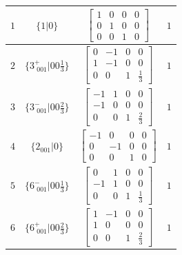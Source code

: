 \documentclass[fleqn,8pt]{jsarticle}
\begin{document}
\begin{longtable}{cccc}
$ 1 $ & $ \{1|0\} $ & $ \begin{bmatrix} 1 & 0 & 0 & 0 \\ 0 & 1 & 0 & 0 \\ 0 & 0 & 1 & 0 \end{bmatrix} $ & $ 1 $ \\ \hline
$ 2 $ & $ \{3^{+}_{\,\,001}|0 0 \frac{1}{3}\} $ & $ \begin{bmatrix} 0 & -1 & 0 & 0 \\ 1 & -1 & 0 & 0 \\ 0 & 0 & 1 & \frac{1}{3} \end{bmatrix} $ & $ 1 $ \\ \hline
$ 3 $ & $ \{3^{-}_{\,\,001}|0 0 \frac{2}{3}\} $ & $ \begin{bmatrix} -1 & 1 & 0 & 0 \\ -1 & 0 & 0 & 0 \\ 0 & 0 & 1 & \frac{2}{3} \end{bmatrix} $ & $ 1 $ \\ \hline
$ 4 $ & $ \{2{}_{001}|0\} $ & $ \begin{bmatrix} -1 & 0 & 0 & 0 \\ 0 & -1 & 0 & 0 \\ 0 & 0 & 1 & 0 \end{bmatrix} $ & $ 1 $ \\ \hline
$ 5 $ & $ \{6^{-}_{\,\,001}|0 0 \frac{1}{3}\} $ & $ \begin{bmatrix} 0 & 1 & 0 & 0 \\ -1 & 1 & 0 & 0 \\ 0 & 0 & 1 & \frac{1}{3} \end{bmatrix} $ & $ 1 $ \\ \hline
$ 6 $ & $ \{6^{+}_{\,\,001}|0 0 \frac{2}{3}\} $ & $ \begin{bmatrix} 1 & -1 & 0 & 0 \\ 1 & 0 & 0 & 0 \\ 0 & 0 & 1 & \frac{2}{3} \end{bmatrix} $ & $ 1 $ \\
\end{longtable}
\end{document}

